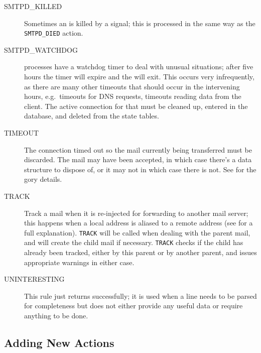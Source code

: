 \begin{description}
    \item [SMTPD\_KILLED] Sometimes an  is killed by a
        signal; this is processed in the same way as the
        \texttt{SMTPD\_DIED} action.

    \item [SMTPD\_WATCHDOG]  processes have a watchdog timer
        to deal with unusual situations; after five hours the timer will
        expire and the  will exit.  This occurs very
        infrequently, as there are many other timeouts that should occur in
        the intervening hours, e.g.\ timeouts for DNS requests, timeouts
        reading data from the client.  The active connection for that
         must be cleaned up, entered in the database, and
        deleted from the state tables.

    \item [TIMEOUT] The connection timed out so the mail currently being
        transferred must be discarded.  The mail may have been accepted, in
        which case there's a data structure to dispose of, or it may not in
        which case there is not.  See  for the gory details.

    \item [TRACK] Track a mail when it is re-injected for forwarding to
        another mail server; this happens when a local address is aliased
        to a remote address (see  for
        a full explanation).  \texttt{TRACK} will be called when dealing
        with the parent mail, and will create the child mail if necessary.
        \texttt{TRACK} checks if the child has already been tracked, either
        by this parent or by another parent, and issues appropriate
        warnings in either case.

    \item [UNINTERESTING] This rule just returns successfully; it is used
        when a line needs to be parsed for completeness but does not either
        provide any useful data or require anything to be done.

\end{description}

\subsection{Adding New Actions}

\label{adding new actions in implementation}

